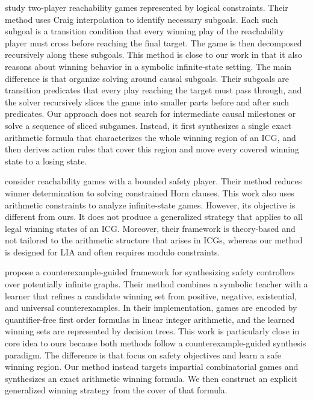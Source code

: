 \documentclass[review]{elsarticle}
\begin{document}
\citet{BaiCF2021} study two-player reachability games represented by logical constraints.
Their method uses Craig interpolation to identify necessary subgoals.
Each such subgoal is a transition condition that every winning play of the reachability player must cross before reaching the final target.
The game is then decomposed recursively along these subgoals.
This method is close to our work in that it also reasons about winning behavior in a symbolic infinite-state setting.
The main difference is that \citet{BaiCF2021} organize solving around causal subgoals.
Their subgoals are transition predicates that every play reaching the target must pass through, and the solver recursively slices the game into smaller parts before and after such predicates.
Our approach does not search for intermediate causal milestones or solve a sequence of sliced subgames.
Instead, it first synthesizes a single exact arithmetic formula that characterizes the whole winning region of an ICG, and then derives action rules that cover this region and move every covered winning state to a losing state.

\citet{FaeP2023} consider reachability games with a bounded safety player.
Their method reduces winner determination to solving constrained Horn clauses.
This work also uses arithmetic constraints to analyze infinite-state games.
However, its objective is different from ours.
It does not produce a generalized strategy that applies to all legal winning states of an ICG.
Moreover, their framework is theory-based and not tailored to the arithmetic structure that arises in ICGs, whereas our method is designed for LIA and often requires modulo constraints.

\citet{DanO2019} propose a counterexample-guided framework for synthesizing safety controllers over potentially infinite graphs.
Their method combines a symbolic teacher with a learner that refines a candidate winning set from positive, negative, existential, and universal counterexamples.
In their implementation, games are encoded by quantifier-free first order formulas in linear integer arithmetic, and the learned winning sets are represented by decision trees.
This work is particularly close in core idea to ours because both methods follow a counterexample-guided synthesis paradigm.
The difference is that \citet{DanO2019} focus on safety objectives and learn a safe winning region.
Our method instead targets impartial combinatorial games and synthesizes an exact arithmetic winning formula.
We then construct an explicit generalized winning strategy from the cover of that formula.
\end{document}
